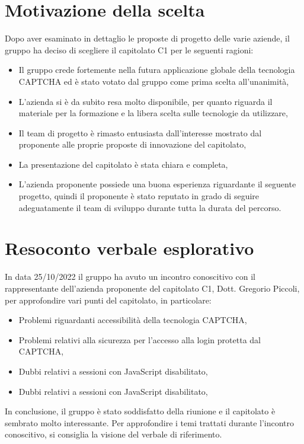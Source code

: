 \documentclass[12pt]{article}
\begin{document}
\section{Motivazione della scelta}
Dopo aver esaminato in dettaglio le proposte di progetto delle varie aziende, il gruppo ha deciso di scegliere il capitolato C1 per le seguenti ragioni:
\begin{itemize}
    \item Il gruppo crede fortemente nella futura applicazione globale della tecnologia CAPTCHA ed è stato votato dal gruppo come prima scelta all'unanimità,
    \item L’azienda si è da subito resa molto disponibile, per quanto riguarda il materiale per la formazione e la libera scelta sulle tecnologie da utilizzare,
    \item Il team di progetto è rimasto entusiasta dall'interesse mostrato dal proponente alle proprie proposte di innovazione del capitolato,
    \item La presentazione del capitolato è stata chiara e completa,
    \item L’azienda proponente possiede una buona esperienza riguardante il seguente progetto, quindi il proponente è stato reputato in grado di seguire adeguatamente il team di sviluppo durante tutta la durata del percorso.
\end{itemize}

\section{Resoconto verbale esplorativo}
In data 25/10/2022 il gruppo ha avuto un incontro conoscitivo con il rappresentante dell'azienda
proponente del capitolato C1, Dott. Gregorio Piccoli, per approfondire vari punti del capitolato,
in particolare:
\begin{itemize}
    \item Problemi riguardanti accessibilità della tecnologia CAPTCHA,
    \item Problemi relativi alla sicurezza per l’accesso alla login protetta dal CAPTCHA,
    \item Dubbi relativi a sessioni con JavaScript disabilitato,
    \item Dubbi relativi a sessioni con JavaScript disabilitato,
\end{itemize}
In conclusione, il gruppo è stato soddisfatto della riunione e il capitolato è sembrato molto
interessante. Per approfondire i temi trattati durante l'incontro conoscitivo, si consiglia la visione
del verbale di riferimento.
\end{document}
